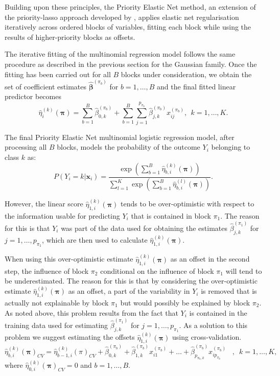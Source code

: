 Building upon these principles, the Priority Elastic Net method, an extension of the priority-lasso approach developed by  \citet{Klau2018prioritylasso}, applies elastic net regularisation iteratively across ordered blocks of variables, fitting each block while using the results of higher-priority blocks as offsets. 

The iterative fitting of the multinomial regression model follows the same procedure as described in the previous section for the Gaussian family. Once the fitting has been carried out for all 
$B$ blocks under consideration, we obtain the set of coefficient estimates $\hat{\boldsymbol{\beta}}^{(\pi_b)}$ for $b = 1, \ldots, B$  and the final fitted linear predictor becomes
\begin{equation}
\hat{\eta}_{i}^{(k)}(\bm{\pi}) = \sum_{b=1}^{B} 
  \hat{\beta}_{0,k}^{(\pi_b)}+
\sum_{b=1}^{B} \sum_{j=1}^{p_{\pi_b}} \hat{\beta}^{(\pi_b)}_{j,k} x^{(\pi_b)}_{ij}, \ \ k=1, \ldots, K.
\end{equation}

The final Priority Elastic Net multinomial logistic regression model, after processing all \( B \) blocks, models the probability of the outcome \( Y_{i} \) belonging to class \( k \) as:
\begin{equation}
P(Y_i = k | \bm{x}_i) = \frac{\exp\left( \sum_{b=1}^{B} \hat{\eta}_{b,i}^{(k)}(\bm{\pi}) \right)}{\sum_{l=1}^{K} \exp\left( \sum_{b=1}^{B} \hat{\eta}_{b,i}^{(l)}(\bm{\pi}) \right)}.
\end{equation}

However, the linear score \(\hat{\eta}_{1,i}^{(k)}(\bm{\pi})\) tends to be over-optimistic with
respect to the information usable for predicting \( Y_{i} \) that is
contained in block $\pi_1$. The reason for this is that
\( Y_{i} \) was part of the data used for obtaining the estimates
$\hat{\beta}_{j,k}^{(\pi_1)}$ for $j = 1, \ldots, p_{\pi_1}$, which are then used to calculate \(\hat{\eta}_{1,i}^{(k)}(\bm{\pi})\).

 When using this over-optimistic estimate \(\hat{\eta}_{1,i}^{(k)}(\bm{\pi})\) as an offset in the second step, the influence of block $\pi_2$ conditional on the influence of block $\pi_1$ will
tend to be underestimated. The reason for this is that
by considering the over-optimistic estimate \(\hat{\eta}_{1,i}^{(k)}(\bm{\pi})\) as an
offset, a part of the variability in \( Y_{i} \) is removed that is
actually not explainable by block $\pi_1$ but would possibly
be explained by block $\pi_2$. As noted above, this problem
results from the fact that \( Y_{i} \) is contained in the training data used for estimating $\hat{\beta}_{j,k}^{(\pi_1)}$ for $j = 1, \ldots, p_{\pi_1}$. As a solution
to this problem we suggest estimating the offsets \(\hat{\eta}_{1,i}^{(k)}(\bm{\pi})\)
using cross-validation.
\begin{equation}
\hat{\eta}_{b,i}^{(k)}(\bm{\pi})_{CV} = \hat{\eta}_{b-1,i}^{(k)}(\pi)_{CV} 
+ \hat{\beta}_{0,k}^{(\pi_b)}
+ \hat{\beta}_{ 1,k}^{(\pi_b)} x_{i1}^{(\pi_b)} + \ldots + \hat{\beta}_{ p_{\pi_b,k}}^{(\pi_b)} x_{ip_{\pi_b}}^{(\pi_b)}\,\,\,\,\, ,\,\,\,  k = 1, \ldots, K,
\end{equation}
where $\hat{\eta}_{0,i}^{(k)}(\bm{\pi})_{CV} = 0$ and $b = 1, \ldots, B$.

